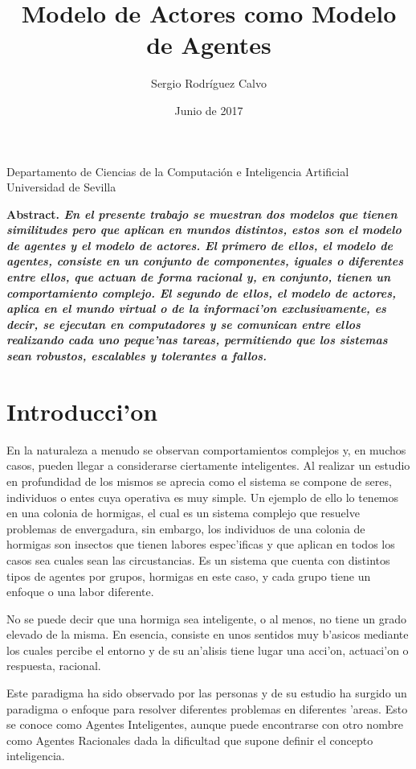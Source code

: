 \documentclass[12pt]{article}
\title{Modelo de Actores como Modelo de Agentes}
\author{Sergio Rodr\'iguez Calvo}
\date{Junio de 2017}
\begin{document}
    \maketitle
    \thispagestyle{empty}
    \begin{center}
      Departamento de Ciencias de la Computaci\'on e
      Inteligencia Artificial \\
      Universidad de Sevilla
      \end{center}
  \bf{Abstract. }\rm
    \emph{En el presente trabajo se muestran dos modelos que tienen similitudes
    pero que aplican en mundos distintos, estos son el modelo de agentes y
    el modelo de actores. El primero de ellos, el modelo de agentes, consiste en
    un conjunto de componentes, iguales o diferentes entre ellos, que actuan de forma
    racional y, en conjunto, tienen un comportamiento complejo. El segundo de ellos,
    el modelo de actores, aplica en el mundo virtual o de la informaci'on exclusivamente, es decir,
    se ejecutan en computadores y se comunican entre ellos realizando cada uno peque'nas tareas,
    permitiendo que los sistemas sean robustos, escalables y tolerantes a fallos.}
\section{Introducci'on}
En la naturaleza a menudo se observan comportamientos complejos y, en muchos casos,
pueden llegar a considerarse ciertamente inteligentes. Al realizar un estudio en profundidad
de los mismos se aprecia como el sistema se compone de seres, individuos o entes cuya operativa
es muy simple. Un ejemplo de ello lo tenemos en una colonia de hormigas, el cual es un
sistema complejo que resuelve problemas de envergadura, sin embargo, los individuos de
una colonia de hormigas son insectos que tienen labores espec'ificas y que aplican en
todos los casos sea cuales sean las circustancias. Es un sistema que cuenta con distintos
tipos de agentes por grupos, hormigas en este caso, y cada grupo tiene un enfoque
o una labor diferente.

No se puede decir que una hormiga sea inteligente, o al menos, no tiene un grado elevado de la misma.
En esencia, consiste en unos sentidos muy b'asicos mediante los cuales percibe el entorno y
de su an'alisis tiene lugar una acci'on, actuaci'on o respuesta, racional.

Este paradigma ha sido observado por las personas y de su estudio ha surgido un paradigma o
enfoque para resolver diferentes problemas en diferentes 'areas. Esto se conoce como Agentes
Inteligentes, aunque puede encontrarse con otro nombre como Agentes Racionales dada la dificultad
que supone definir el concepto inteligencia.
\end{document}
